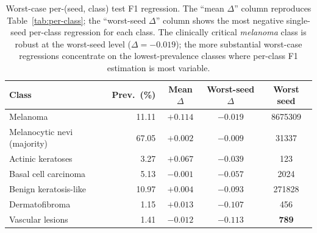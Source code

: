 \documentclass[11pt,a4paper]{article}
\begin{document}
\begin{table}[!htbp]
\centering
\small
\begin{tabular}{lrccc}
\toprule
Class                              & Prev.\ (\%) & Mean $\Delta$ & Worst-seed $\Delta$ & Worst seed \\
\midrule
Melanoma                           & 11.11 & $+0.114$ & $-0.019$ & 8675309 \\
Melanocytic nevi (majority)        & 67.05 & $+0.002$ & $-0.009$ & 31337 \\
Actinic keratoses                  &  3.27 & $+0.067$ & $-0.039$ & 123 \\
Basal cell carcinoma               &  5.13 & $-0.001$ & $-0.057$ & 2024 \\
Benign keratosis-like              & 10.97 & $+0.004$ & $-0.093$ & 271828 \\
Dermatofibroma                     &  1.15 & $+0.013$ & $-0.107$ & 456 \\
Vascular lesions                   &  1.41 & $-0.012$ & $\mathbf{-0.113}$ & \textbf{789} \\
\bottomrule
\end{tabular}
\caption{Worst-case per-(seed, class) test F1 regression. The
``mean $\Delta$'' column reproduces Table~\ref{tab:per-class}; the
``worst-seed $\Delta$'' column shows the most negative single-seed
per-class regression for each class. The clinically critical
\textit{melanoma} class is robust at the worst-seed level
($\Delta = -0.019$); the more substantial worst-case regressions
concentrate on the lowest-prevalence classes where per-class F1
estimation is most variable.}
\label{tab:worst-per-class}
\end{table}
\end{document}
